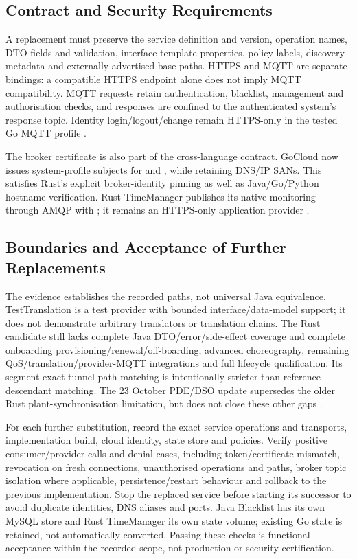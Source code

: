\documentclass[a4paper]{arrowhead}
\begin{document}
\subsection{Contract and Security Requirements}
A replacement must preserve the service definition and version, operation names,
DTO fields and validation, interface-template properties, policy labels, discovery
metadata and externally advertised base paths. HTTPS and MQTT are separate
bindings: a compatible HTTPS endpoint alone does not imply MQTT compatibility.
MQTT requests retain authentication, blacklist, management and authorisation
checks, and responses are confined to the authenticated system's response topic.
Identity login/logout/change remain HTTPS-only in the tested Go MQTT profile
\cite{goMqtt20261024}.

The broker certificate is also part of the cross-language contract. GoCloud now
issues system-profile subjects for 
and , while retaining DNS/IP SANs.
This satisfies Rust's explicit broker-identity pinning as well as Java/Go/Python
hostname verification. Rust TimeManager publishes its native monitoring through
AMQP with ; it remains an HTTPS-only
application provider \cite{goMqtt20261024}.

\subsection{Boundaries and Acceptance of Further Replacements}
The evidence establishes the recorded paths, not universal Java equivalence.
TestTranslation is a test provider with bounded interface/data-model support;
it does not demonstrate arbitrary translators or translation chains. The Rust
candidate still lacks complete Java DTO/error/side-effect coverage and complete
onboarding provisioning/renewal/off-boarding, advanced choreography, remaining
QoS/translation/provider-MQTT integrations and full lifecycle qualification.
Its segment-exact tunnel path matching is intentionally stricter than reference
descendant matching. The 23 October PDE/DSO update supersedes the older Rust
plant-synchronisation limitation, but does not close these other gaps
\cite{goMqtt20261024,rustFederation20261019,nativePde20261023}.

For each further substitution, record the exact service operations and transports,
implementation build, cloud identity, state store and policies. Verify positive
consumer/provider calls and denial cases, including token/certificate mismatch,
revocation on fresh connections, unauthorised operations and paths, broker topic
isolation where applicable, persistence/restart behaviour and rollback to the
previous implementation. Stop the replaced service before starting its successor
to avoid duplicate identities, DNS aliases and ports. Java Blacklist has its own
MySQL store and Rust TimeManager its own state volume; existing Go state is
retained, not automatically converted. Passing these checks is functional
acceptance within the recorded scope, not production or security certification.
\end{document}
